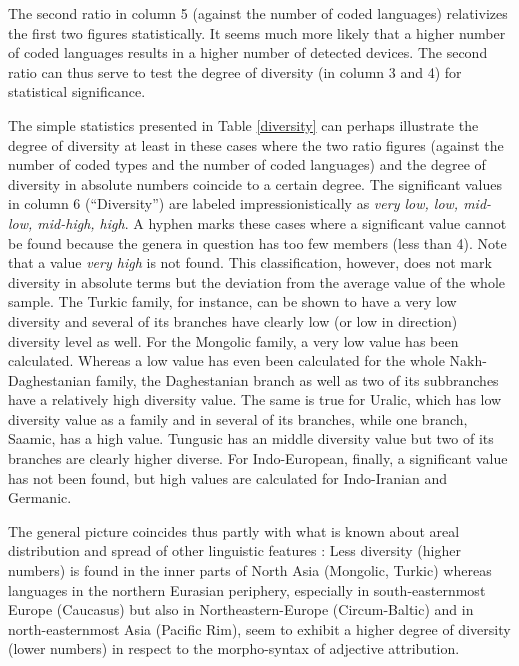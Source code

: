 The second ratio in column 5 (against the number of coded languages) relativizes the first two figures statistically. It seems much more likely that a higher number of coded languages results in a higher number of detected devices. The second ratio can thus serve to test the degree of diversity (in column 3 and 4) for statistical significance. 

The simple statistics presented in Table  \ref{diversity} can perhaps illustrate the degree of diversity at least in these cases where the two ratio figures (against the number of coded types and the number of coded languages) and the degree of diversity in absolute numbers coincide to a certain degree. The significant values in column 6 (“Diversity”) are labeled impressionistically as \textit{very low, low, mid-low, mid-high, high}. A hyphen marks these cases where a significant value cannot be found because the genera in question has too few members (less than 4). Note that a value \textit{very high} is not found. This classification, however, does not mark diversity in absolute terms but the deviation from the average value of the whole sample. The Turkic family, for instance,  can be shown to have a very low diversity and several of its branches have clearly low (or low in direction) diversity level as well. For the Mongolic family, a very low value has been calculated. Whereas a low value has even been calculated for the whole Nakh-Daghestanian family, the Daghestanian branch as well as two of its subbranches have a relatively high diversity value. The same is true for Uralic, which has low diversity value as a family and in several of its branches, while one branch, Saamic, has a high value. Tungusic has an middle diversity value but two of its branches are clearly higher diverse. For Indo-European, finally, a significant value has not been found, but high values are calculated for Indo-Iranian and Germanic.

The general picture coincides thus partly with what is known about areal distribution and spread of other linguistic features \citep[cf., e.g.,][]{nichols1992}: Less diversity (higher numbers) is found in the inner parts of North Asia (Mongolic, Turkic) whereas languages in the northern Eurasian periphery, especially in south-easternmost Europe (Caucasus) but also in Northeastern-Europe (Circum-Baltic) and in north-easternmost Asia (Pacific Rim), seem to exhibit a higher degree of diversity (lower numbers) in respect to the morpho-syntax of adjective attribution.


